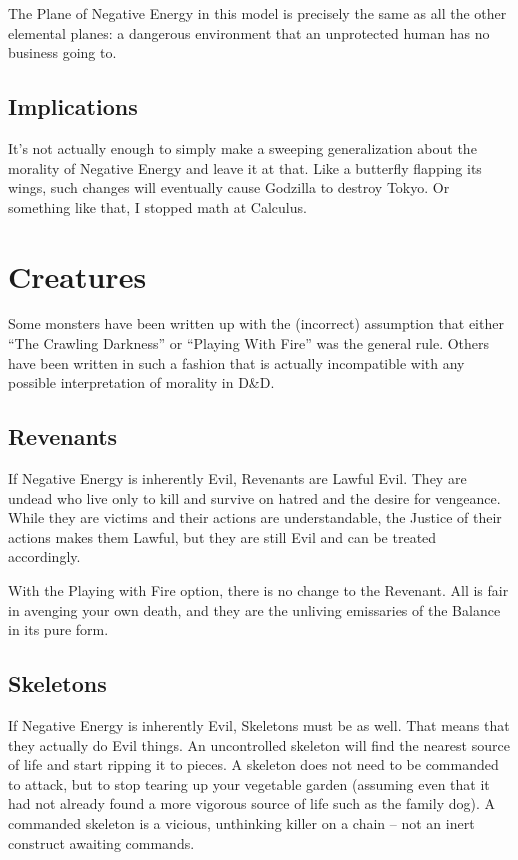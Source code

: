 The Plane of Negative Energy in this model is precisely the same as all the other elemental planes: a dangerous environment that an unprotected human has no business going to.

\subsection{Implications}

It's not actually enough to simply make a sweeping generalization about the morality of Negative Energy and leave it at that. Like a butterfly flapping its wings, such changes will eventually cause Godzilla to destroy Tokyo. Or something like that, I stopped math at Calculus.

\section{Creatures}

Some monsters have been written up with the (incorrect) assumption that either ``The Crawling Darkness'' or ``Playing With Fire'' was the general rule. Others have been written in such a fashion that is actually incompatible with any possible interpretation of morality in D\&D.

\subsection{Revenants} If Negative Energy is inherently Evil, Revenants are Lawful Evil. They are undead who live only to kill and survive on hatred and the desire for vengeance. While they are victims and their actions are understandable, the Justice of their actions makes them Lawful, but they are still Evil and can be treated accordingly.

With the Playing with Fire option, there is no change to the Revenant. All is fair in avenging your own death, and they are the unliving emissaries of the Balance in its pure form.

\subsection{Skeletons} If Negative Energy is inherently Evil, Skeletons must be as well. That means that they actually do Evil things. An uncontrolled skeleton will find the nearest source of life and start ripping it to pieces. A skeleton does not need to be commanded to attack, but to stop tearing up your vegetable garden (assuming even that it had not already found a more vigorous source of life such as the family dog). A commanded skeleton is a vicious, unthinking killer on a chain -- not an inert construct awaiting commands.

